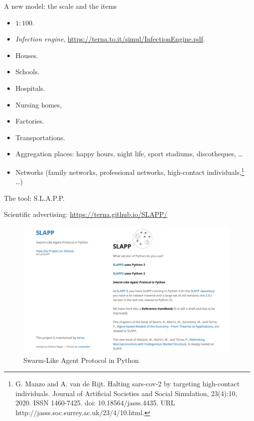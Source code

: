 \documentclass[8pt]{beamer}
\begin{document}
\begin{frame}{A new model: the scale and the items}

\begin{itemize}

\item $1:100$.

\item \textit{Infection engine}, \url{https://terna.to.it/simul/InfectionEngine.pdf}.

\item Houses.
\item Schools.
\item Hospitals.
\item Nursing homes,
\item Factories.
\color{red}
\item Transportations.
\item Aggregation places: happy hours, night life, sport stadiums, discotheques, \ldots
\color{blue}
\item Networks (family networks, professional networks, high-contact individuals,\footnote{G. Manzo and A. van de Rijt. Halting sars-cov-2 by targeting high-contact individuals. Journal of Artificial Societies and Social Simulation, 23(4):10, 2020. ISSN 1460-7425. doi: 10.18564/jasss.4435. URL http://jasss.soc.surrey.ac.uk/23/4/10.html.} \ldots) 

\end{itemize}

\end{frame}

\begin{frame}{The tool: S.L.A.P.P.}

Scientific advertising: \url{https://terna.github.io/SLAPP/}

\begin{figure}[H]
\center
\includegraphics[scale=0.26]{SLAPP.png}

\caption{Swarm-Like Agent Protocol in Python} 
\label{SLAPP}
\end{figure}

\end{frame}
\end{document}
